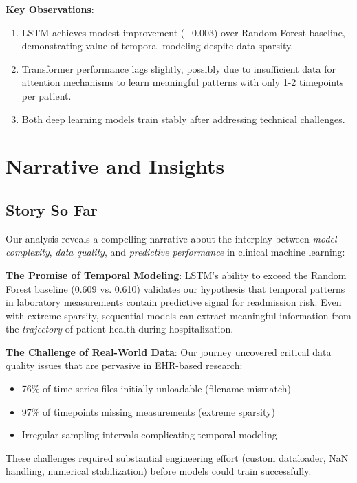 \documentclass[conference]{IEEEtran}
\begin{document}
\textbf{Key Observations}:
\begin{enumerate}
    \item LSTM achieves modest improvement (+0.003) over Random Forest baseline, demonstrating value of temporal modeling despite data sparsity.
    \item Transformer performance lags slightly, possibly due to insufficient data for attention mechanisms to learn meaningful patterns with only 1-2 timepoints per patient.
    \item Both deep learning models train stably after addressing technical challenges.
\end{enumerate}

\section{Narrative and Insights}

\subsection{Story So Far}

Our analysis reveals a compelling narrative about the interplay between \textit{model complexity}, \textit{data quality}, and \textit{predictive performance} in clinical machine learning:

\textbf{The Promise of Temporal Modeling}: LSTM's ability to exceed the Random Forest baseline (0.609 vs. 0.610) validates our hypothesis that temporal patterns in laboratory measurements contain predictive signal for readmission risk. Even with extreme sparsity, sequential models can extract meaningful information from the \textit{trajectory} of patient health during hospitalization.

\textbf{The Challenge of Real-World Data}: Our journey uncovered critical data quality issues that are pervasive in EHR-based research:
\begin{itemize}
    \item 76\% of time-series files initially unloadable (filename mismatch)
    \item 97\% of timepoints missing measurements (extreme sparsity)
    \item Irregular sampling intervals complicating temporal modeling
\end{itemize}

These challenges required substantial engineering effort (custom dataloader, NaN handling, numerical stabilization) before models could train successfully.
\end{document}

